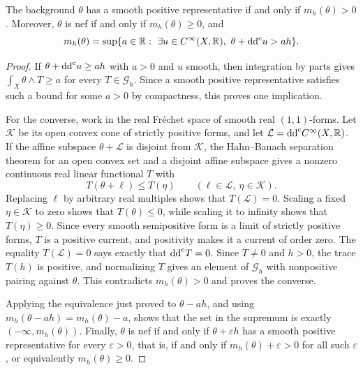 \begin{theorem}\label{thm:smooth-cone-current-duality}
The background $\theta$ has a smooth positive representative if and only if $m_h(\theta)>0$. Moreover, $\theta$ is nef if and only if $m_h(\theta)\geq0$, and
\[
 m_h(\theta)=\sup\{a\in\mathbb R:\ \exists u\in C^\infty(X,\mathbb R),
                                  \ \theta+\ddc u>ah\}.
\]
\end{theorem}
\begin{proof}
If $\theta+\mathrm{dd}^{\mathrm{c}} u\geq ah$ with $a>0$ and $u$ smooth, then integration by parts gives $\int_X\theta\wedge T\geq a$ for every $T\in\mathscr G_h$. Since a smooth positive representative satisfies such a bound for some $a>0$ by compactness, this proves one implication.

For the converse, work in the real Fr\'echet space of smooth real $(1,1)$-forms. Let $\mathcal K$ be its open convex cone of strictly positive forms, and let $\mathcal L=\mathrm{dd}^{\mathrm{c}} C^\infty(X,\mathbb R)$. If the affine subspace $\theta+\mathcal L$ is disjoint from $\mathcal K$, the Hahn--Banach separation theorem for an open convex set and a disjoint affine subspace gives a nonzero continuous real linear functional $T$ with
\[
 T(\theta+\ell)\leq T(\eta)\qquad(\ell\in\mathcal L,\ \eta\in\mathcal K).
\]
Replacing $\ell$ by arbitrary real multiples shows that $T(\mathcal L)=0$. Scaling a fixed $\eta\in\mathcal K$ to zero shows that $T(\theta)\leq0$, while scaling it to infinity shows that $T(\eta)\geq0$. Since every smooth semipositive form is a limit of strictly positive forms, $T$ is a positive current, and positivity makes it a current of order zero. The equality $T(\mathcal L)=0$ says exactly that $\mathrm{dd}^{\mathrm{c}} T=0$. Since $T\ne0$ and $h>0$, the trace $T(h)$ is positive, and normalizing $T$ gives an element of $\mathscr G_h$ with nonpositive pairing against $\theta$. This contradicts $m_h(\theta)>0$ and proves the converse.

Applying the equivalence just proved to $\theta-ah$, and using $m_h(\theta-ah)=m_h(\theta)-a$, shows that the set in the supremum is exactly $(-\infty,m_h(\theta))$. Finally, $\theta$ is nef if and only if $\theta+\varepsilon h$ has a smooth positive representative for every $\varepsilon>0$, that is, if and only if $m_h(\theta)+\varepsilon>0$ for all such $\varepsilon$, or equivalently $m_h(\theta)\geq0$.
\end{proof}

